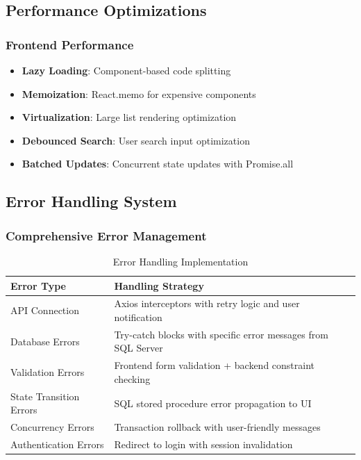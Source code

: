 \documentclass[11pt,a4paper]{article}
\begin{document}
\subsection{Performance Optimizations}

\subsubsection*{Frontend Performance}
\begin{itemize}
    \item \textbf{Lazy Loading}: Component-based code splitting
    \item \textbf{Memoization}: React.memo for expensive components
    \item \textbf{Virtualization}: Large list rendering optimization
    \item \textbf{Debounced Search}: User search input optimization
    \item \textbf{Batched Updates}: Concurrent state updates with Promise.all
\end{itemize}


\subsection{Error Handling System}

\subsubsection*{Comprehensive Error Management}
\begin{table}[H]
    \centering
    \begin{tabularx}{\textwidth}{|l|p{10cm}|}
        \hline
        \rowcolor{tableheader}
        \textbf{Error Type} & \textbf{Handling Strategy} \\
        \hline
        API Connection & Axios interceptors with retry logic and user notification \\
        \hline
        Database Errors & Try-catch blocks with specific error messages from SQL Server \\
        \hline
        Validation Errors & Frontend form validation + backend constraint checking \\
        \hline
        State Transition Errors & SQL stored procedure error propagation to UI \\
        \hline
        Concurrency Errors & Transaction rollback with user-friendly messages \\
        \hline
        Authentication Errors & Redirect to login with session invalidation \\
        \hline
    \end{tabularx}
    \caption{Error Handling Implementation}
\end{table}
\end{document}
